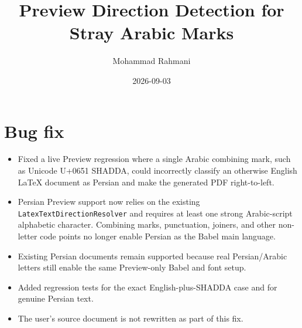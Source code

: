\documentclass[a4paper]{article}
\title{Preview Direction Detection for Stray Arabic Marks}
\date{2026-09-03}
\author{Mohammad Rahmani}
\begin{document}
   \maketitle

   \section{Bug fix}
   \begin{itemize}
      \item Fixed a live Preview regression where a single Arabic combining mark, such as Unicode U+0651 SHADDA, could incorrectly classify an otherwise English LaTeX document as Persian and make the generated PDF right-to-left.
      \item Persian Preview support now relies on the existing \texttt{LatexTextDirectionResolver} and requires at least one strong Arabic-script alphabetic character. Combining marks, punctuation, joiners, and other non-letter code points no longer enable Persian as the Babel main language.
      \item Existing Persian documents remain supported because real Persian/Arabic letters still enable the same Preview-only Babel and font setup.
      \item Added regression tests for the exact English-plus-SHADDA case and for genuine Persian text.
      \item The user's source document is not rewritten as part of this fix.
   \end{itemize}

   
   
\end{document}

